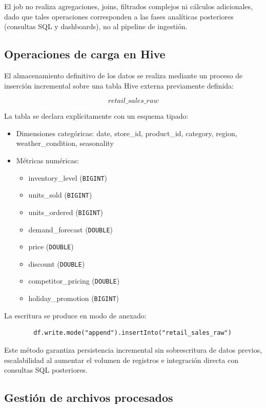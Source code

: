\documentclass[12pt,a4paper]{article}
\begin{document}
	El job no realiza agregaciones, joins, filtrados complejos ni cálculos adicionales, dado que tales operaciones corresponden a las fases analíticas posteriores (consultas SQL y dashboards), no al pipeline de ingestión.
	
	\subsection{Operaciones de carga en Hive}
	
	El almacenamiento definitivo de los datos se realiza mediante un proceso de inserción incremental sobre una tabla Hive externa previamente definida:
	
	\[
	retail\_sales\_raw
	\]
	
	La tabla se declara explícitamente con un esquema tipado:
	
	\begin{itemize}
		\item Dimensiones categóricas: date, store\_id, product\_id, category, region, weather\_condition, seasonality
		\item Métricas numéricas:
		\begin{itemize}
			\item inventory\_level (\texttt{BIGINT})
			\item units\_sold (\texttt{BIGINT})
			\item units\_ordered (\texttt{BIGINT})
			\item demand\_forecast (\texttt{DOUBLE})
			\item price (\texttt{DOUBLE})
			\item discount (\texttt{DOUBLE})
			\item competitor\_pricing (\texttt{DOUBLE})
			\item holiday\_promotion (\texttt{BIGINT})
		\end{itemize}
	\end{itemize}
	
	La escritura se produce en modo de anexado:
	
	\begin{verbatim}
		df.write.mode("append").insertInto("retail_sales_raw")
	\end{verbatim}
	
	Este método garantiza persistencia incremental sin sobrescritura de datos previos, escalabilidad al aumentar el volumen de registros e integración directa con consultas SQL posteriores.
	
	\subsection{Gestión de archivos procesados}
	
\end{document}

